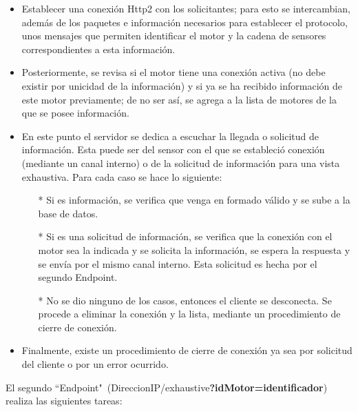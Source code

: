     \begin{itemize}
        \item Establecer una conexión Http2 con los solicitantes; para esto se intercambian,
            además de los paquetes e información necesarios para establecer el protocolo,
            unos mensajes que permiten identificar el motor y la cadena de sensores
            correspondientes a esta información.
        \item Posteriormente, se revisa si el motor
            tiene una conexión activa (no debe  existir por unicidad de la información)
            y si ya se ha recibido información de este motor previamente; de no ser así,
            se agrega a la lista de motores de la que se posee información.
        \item En este punto el servidor se dedica a escuchar la llegada o solicitud
            de información. Esta puede ser del sensor con el que se estableció
            conexión (mediante un canal interno) o  de la solicitud de información
            para una vista exhaustiva. Para cada caso se hace lo siguiente:
            \begin{itemize}
                \item[*] Si es información, se verifica que venga en formado válido
                    y se sube a la base de datos.
                \item[*] Si es una solicitud de información, se verifica que
                    la conexión con el motor sea la indicada y se solicita la
                    información, se espera la respuesta y se envía por el mismo
                    canal interno. Esta solicitud es hecha por el segundo Endpoint.
                \item[*] No se dio ninguno de los casos, entonces el cliente se
                    desconecta. Se procede a eliminar la conexión y la lista,
                    mediante un procedimiento de cierre de conexión.
            \end{itemize}
        \item Finalmente, existe un procedimiento de cierre de conexión ya sea
            por solicitud del cliente o por un error ocurrido.
    \end{itemize}


    El segundo ``Endpoint"\ (DireccionIP/exhaustive\textbf{?idMotor=identificador})
    realiza las siguientes tareas:

